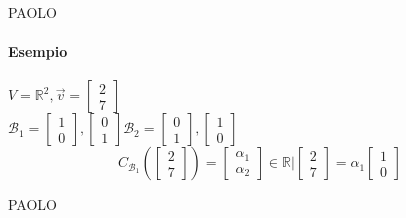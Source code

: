 PAOLO 

\paragraph{Esempio} $V=\mathbb{R}^2, \vec{v}= 
\begin{bmatrix}
    2\\7
\end{bmatrix}$\\
$\mathcal{B}_1=
\begin{bmatrix}
    1\\0
\end{bmatrix}
,
\begin{bmatrix}
    0\\1
\end{bmatrix}
\mathcal{B}_2=
\begin{bmatrix}
    0\\1
\end{bmatrix}
,
\begin{bmatrix}
    1\\0
\end{bmatrix}
$\\

\[
    C_{\mathcal{B}_1}( 
    \begin{bmatrix}  
        2\\7
    \end{bmatrix}  
    )
    = 
    \begin{bmatrix}
        \alpha_1\\
        \alpha_2
    \end{bmatrix}
    \in\mathbb{R}\Big| 
    \begin{bmatrix}
        2\\7
    \end{bmatrix}
    =\alpha_1
    \begin{bmatrix}
        1\\0
    \end{bmatrix}
\]

PAOLO







    





